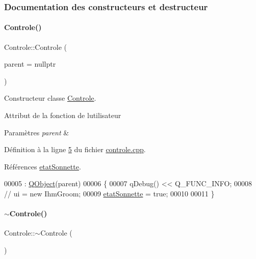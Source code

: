 \subsubsection{Documentation des constructeurs et destructeur}
\mbox{\label{class_controle_af64a33acc664bf02f2ea0b4f27f781e6}} 
\paragraph{\texorpdfstring{Controle()}{Controle()}}
{\footnotesize\ttfamily Controle\+::\+Controle (\begin{DoxyParamCaption}\item[{\hyperlink{class_q_object}{Q\+Object} $\ast$}]{parent = {\ttfamily nullptr} }\end{DoxyParamCaption})}



Constructeur classe \hyperlink{class_controle}{Controle}. 

Attribut de la fonction de l\textquotesingle{}utilisateur 
\begin{DoxyParams}{Paramètres}
{\em parent} & \\
\hline
\end{DoxyParams}


Définition à la ligne \hyperlink{controle_8cpp_source_l00005}{5} du fichier \hyperlink{controle_8cpp_source}{controle.\+cpp}.



Références \hyperlink{controle_8h_source_l00070}{etat\+Sonnette}.


\begin{DoxyCode}
00005                                   : \hyperlink{class_q_object}{QObject}(parent)
00006 \{
00007      qDebug() << Q\_FUNC\_INFO;
00008    \textcolor{comment}{//     ui = new IhmGroom;}
00009     \hyperlink{class_controle_afddf1dce812ff88577e308684b564f33}{etatSonnette} = \textcolor{keyword}{true};
00010 
00011 \}
\end{DoxyCode}
\mbox{\label{class_controle_a98f5d2630efbdb5f469cbb2675725b20}} 
\paragraph{\texorpdfstring{$\sim$\+Controle()}{~Controle()}}
{\footnotesize\ttfamily Controle\+::$\sim$\+Controle (\begin{DoxyParamCaption}{ }\end{DoxyParamCaption})}



